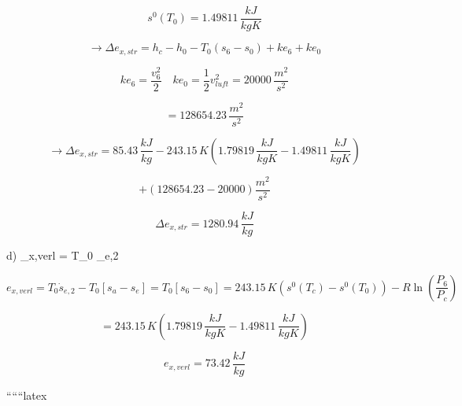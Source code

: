 \[
s^0 (T_0) = 1.49811 \, \frac{kJ}{kgK}
\]

\[
\rightarrow \Delta e_{x,str} = h_c - h_0 - T_0 (s_6 - s_0) + ke_6 + ke_0
\]

\[
ke_6 = \frac{v_6^2}{2} \quad ke_0 = \frac{1}{2} v_{luft}^2 = 20000 \, \frac{m^2}{s^2}
\]

\[
= 128654.23 \, \frac{m^2}{s^2}
\]

\[
\rightarrow \Delta e_{x,str} = 85.43 \, \frac{kJ}{kg} - 243.15 \, K \left( 1.79819 \, \frac{kJ}{kgK} - 1.49811 \, \frac{kJ}{kgK} \right)
\]

\[
+ \left( 128654.23 - 20000 \right) \frac{m^2}{s^2}
\]

\[
\Delta e_{x,str} = 1280.94 \, \frac{kJ}{kg}
\]

d) \quad {}_{x,verl} = T_0 _{e,2}

\[
e_{x,verl} = T_0 \dot{s}_{e,2} - T_0 [s_a - s_e] = T_0 [s_6 - s_0] = 243.15 \, K \left( s^0 (T_c) - s^0 (T_0) \right) - R \ln \left( \frac{P_6}{P_c} \right)
\]

\[
= 243.15 \, K \left( 1.79819 \, \frac{kJ}{kgK} - 1.49811 \, \frac{kJ}{kgK} \right)
\]

\[
e_{x,verl} = 73.42 \, \frac{kJ}{kg}
\]

``````latex


